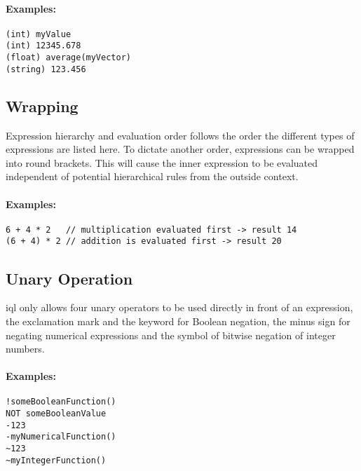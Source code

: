 \documentclass[11pt,a4paper]{report}
\begin{document}
\paragraph{Examples:}

\begin{Verbatim}[samepage=true]
(int) myValue
(int) 12345.678
(float) average(myVector)
(string) 123.456
\end{Verbatim}

\subsection{Wrapping}
\label{sec:wrapping}

Expression hierarchy and evaluation order follows the order the different types of expressions are listed here. To dictate another order, expressions can be wrapped into round brackets. This will cause the inner expression to be evaluated independent of potential hierarchical rules from the outside context.

\paragraph{Examples:}

\begin{Verbatim}[samepage=true]
6 + 4 * 2   // multiplication evaluated first -> result 14
(6 + 4) * 2 // addition is evaluated first -> result 20
\end{Verbatim}

\subsection{Unary Operation}
\label{sec:unary-operation}

\ac{iql} only allows four unary operators to be used directly in front of an expression, the exclamation mark \lit{!} and the  keyword for Boolean negation, the minus sign \lit{\textminus} for negating numerical expressions and the \lit{\texttildelow} symbol of bitwise negation of integer numbers.

\paragraph{Examples:}

\begin{Verbatim}[samepage=true]
!someBooleanFunction()
NOT someBooleanValue
-123
-myNumericalFunction()
~123
~myIntegerFunction()
\end{Verbatim}
\end{document}
